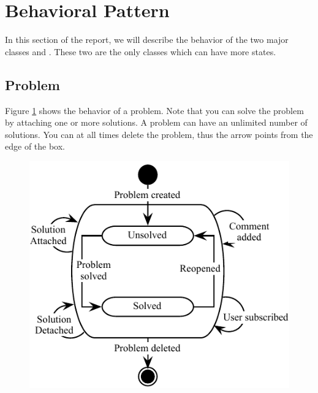  \section{Behavioral Pattern}
In this section of the report, we will describe the behavior of the two major classes  and . These two are the only classes which can have more states. 


\subsection{Problem}
\label{sub:problem}
Figure \ref{fig:Klasse_diagram_problem} shows the behavior of a problem. Note that you can solve the problem by attaching one or more solutions. A problem can have an unlimited number of solutions. You can at all times delete the problem, thus the arrow points from the edge of the box.
\begin{figure}[H]
\begin{center}
\includegraphics[scale=1]{input/problem_domain_analysis/Klassediagram_problem.pdf}
\label{fig:Klasse_diagram_problem}
\end{center}
\end{figure}

